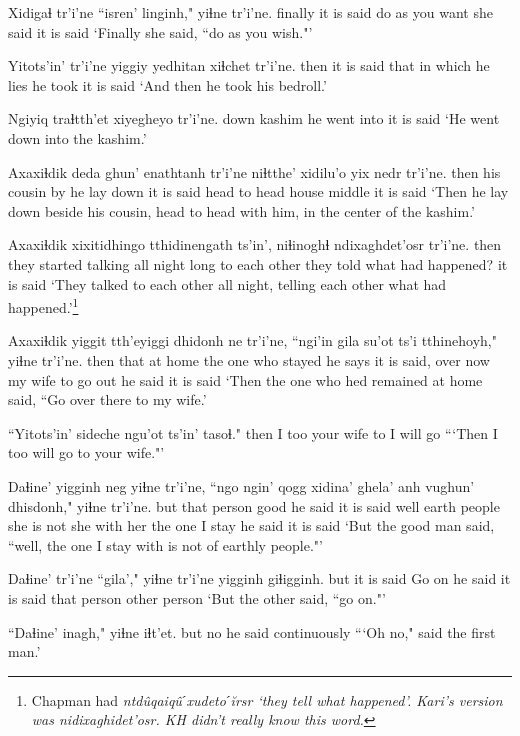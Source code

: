 \documentclass[12pt]{article}
\begin{document}
\gll Xidigaɬ tr'i'ne {``isren' linginh,"} yiɬne  tr'i'ne.
finally {it is said}  {do as you want} {she said} {it is said}
\glt `Finally she said, ``do as you wish."'
\glend

\gll Yitots'in' tr'i'ne yiggiy  yedhitan  xiɬchet tr'i'ne.
then  {it is said} that  {in which he lies} {he took}  {it is said}
\glt `And then he took his bedroll.'
\glend

\gll Ngiyiq traɬtth'et xiyegheyo tr'i'ne.
down  kashim  {he went into} {it is said}
\glt `He went down into the kashim.'
\glend

\gll Axaxiɬdik deda  ghun'  enathtanh tr'i'ne {niɬtthe' xidilu'o} yix nedr tr'i'ne.
then  {his cousin} by  {he lay down} {it is said} {head to head}  house middle {it is said}
\glt `Then he lay down beside his cousin, head to head with him, in the center of the kashim.'
\glend

\gll Axaxiɬdik xixitidhingo  tthidinengath ts'in', niɬinoghɬ ndixaghdet'osr  tr'i'ne.
then  {they started talking} {all night long} {} {to each other} {they told what had happened?} {it is said}
\glt `They talked to each other all night, telling each other what had happened.'\footnote{Chapman had \em ntd\^uqaiq\^uˊxudetoˊ\u{i}rsr \em `they tell what happened'. Kari's version was \em nidixaghidet'osr.  \em KH didn't really know this word.}
\glend

\gll Axaxiɬdik yiggit tth'eyiggi dhidonh  ne tr'i'ne, ``ngi'in gila su'ot  ts'i tthinehoyh," yiɬne tr'i'ne.
then  that {at home} {the one who stayed} {he says} {it is said,} over  now {my wife} to {go out} {he said} {it is said}
\glt `Then the one who hed remained at home said, ``Go over there to my wife.'
\glend

\gll ``Yitots'in' sideche ngu'ot  ts'in' tasoɬ."
then  {I too} {your wife} to {I will go}
\glt ```Then I too will go to your wife."'
\glend

\gll Daɬine' yigginh neg yiɬne tr'i'ne, ``ngo {ngin' qogg} xidina' ghela'  anh vughun' dhisdonh," yiɬne tr'i'ne.
but {that person} good {he said} {it is said} well earth  people {she is not} she {with her} {the one I stay} {he said} {it is said}
\glt `But the good man said, ``well, the one I stay with is not of earthly people."'
\glend

\gll Daɬine' tr'i'ne ``gila'," yiɬne tr'i'ne yigginh giɬigginh.
but  {it is said} {Go on} {he said} {it is said} {that person} {other person}
\glt `But the other said, ``go on."'
\glend

\gll ``Daɬine' inagh," yiɬne  iɬt'et.
but  no {he said}  continuously
\glt ```Oh no," said the first man.'
\glend
\end{document}
